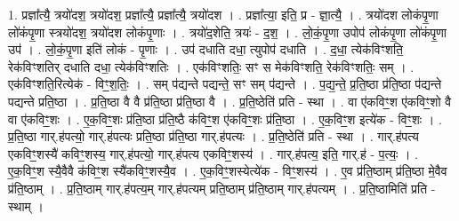 \documentclass[17pt]{extarticle}
\begin{document}
1. प्रज्ञा᳚त्यै॒ त्रयो॑दश॒ त्रयो॑दश॒ प्रज्ञा᳚त्यै॒ प्रज्ञा᳚त्यै॒ त्रयो॑दश । . प्रज्ञा᳚त्या॒ इति॒ प्र - ज्ञा॒त्यै॒ । . त्रयो॑दश लोकंपृ॒णा लो॑कंपृ॒णा स्त्रयो॑दश॒ त्रयो॑दश लोकंपृ॒णाः । . त्रयो॑द॒शेति॒ त्रयः॑ - द॒श॒ । . लो॒कं॒पृ॒णा उपोप॑ लोकंपृ॒णा लो॑कंपृ॒णा उप॑ । . लो॒कं॒पृ॒णा इति॑ लोकं - पृ॒णाः । . उप॑ दधाति दधा॒ त्युपोप॑ दधाति । . द॒धा॒ त्येक॑विꣳशति॒ रेक॑विꣳशतिर् दधाति दधा॒ त्येक॑विꣳशतिः । . एक॑विꣳशतिः॒ सꣳ स मेक॑विꣳशति॒ रेक॑विꣳशतिः॒ सम् । . एक॑विꣳशति॒रित्येक॑ - विꣳ॒॒श॒तिः॒ । . सम् प॑द्यन्ते पद्यन्ते॒ सꣳ सम् प॑द्यन्ते । . प॒द्य॒न्ते॒ प्र॒ति॒ष्ठा प्र॑ति॒ष्ठा प॑द्यन्ते पद्यन्ते प्रति॒ष्ठा । . प्र॒ति॒ष्ठा वै वै प्र॑ति॒ष्ठा प्र॑ति॒ष्ठा वै । . प्र॒ति॒ष्ठेति॑ प्रति - स्था । . वा ए॑कविꣳ॒॒श ए॑कविꣳ॒॒शो वै वा ए॑कविꣳ॒॒शः । . ए॒क॒विꣳ॒॒शः प्र॑ति॒ष्ठा प्र॑ति॒ष्ठै क॑विꣳ॒॒श ए॑कविꣳ॒॒शः प्र॑ति॒ष्ठा । . ए॒क॒विꣳ॒॒श इत्ये॑क - विꣳ॒॒शः । . प्र॒ति॒ष्ठा गार्.ह॑पत्यो॒ गार्.ह॑पत्यः प्रति॒ष्ठा प्र॑ति॒ष्ठा गार्.ह॑पत्यः । . प्र॒ति॒ष्ठेति॑ प्रति - स्था । . गार्.ह॑पत्य एकविꣳ॒॒शस्यै॑ कविꣳ॒॒शस्य॒ गार्.ह॑पत्यो॒ गार्.ह॑पत्य एकविꣳ॒॒शस्य॑ । . गार्.ह॑पत्य॒ इति॒ गार्.ह॑ - प॒त्यः॒ । . ए॒क॒विꣳ॒॒श स्यै॒वैवै क॑विꣳ॒॒श स्यै॑कविꣳ॒॒शस्यै॒व । . ए॒क॒विꣳ॒॒शस्येत्ये॑क - विꣳ॒॒शस्य॑ । . ए॒व प्र॑ति॒ष्ठाम् प्र॑ति॒ष्ठा मे॒वैव प्र॑ति॒ष्ठाम् । . प्र॒ति॒ष्ठाम् गार्.ह॑पत्य॒म् गार्.ह॑पत्यम् प्रति॒ष्ठाम् प्र॑ति॒ष्ठाम् गार्.ह॑पत्यम् । . प्र॒ति॒ष्ठामिति॑ प्रति - स्थाम् । \newline
\end{document}
